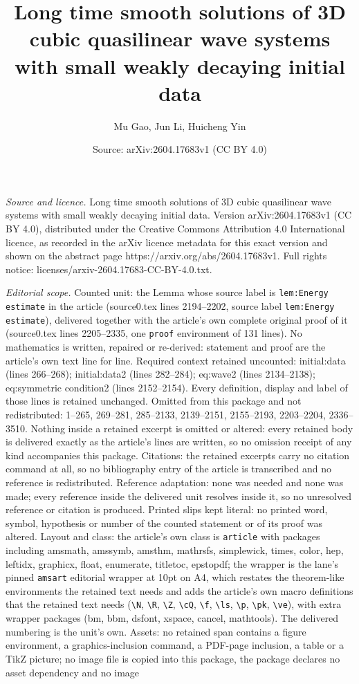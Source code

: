 \documentclass[10pt,a4paper]{amsart}
\title[Long time smooth solutions of 3D cubic quasilinear wave syst]{Long time smooth solutions of 3D cubic quasilinear wave systems with small weakly decaying initial data}
\author{Mu Gao, Jun Li, Huicheng Yin}
\date{Source: arXiv:2604.17683v1 (CC BY 4.0)}
\begin{document}
\maketitle

\noindent\emph{Source and licence.} Long time smooth solutions of 3D cubic quasilinear wave systems with small weakly decaying initial data. Version arXiv:2604.17683v1 (CC BY 4.0), distributed under the Creative Commons Attribution 4.0 International licence, as recorded in the arXiv licence metadata for this exact version and shown on the abstract page https://arxiv.org/abs/2604.17683v1. Full rights notice: licenses/arxiv-2604.17683-CC-BY-4.0.txt.\par\smallskip

\noindent\textit{Editorial scope.} Counted unit: the Lemma whose source label is \texttt{lem:Energy estimate} in the article (source0.tex lines 2194--2202, source label \texttt{lem:Energy estimate}), delivered together with the article's own complete original proof of it (source0.tex lines 2205--2335, one \texttt{proof} environment of 131 lines). No mathematics is written, repaired or re-derived: statement and proof are the article's own text line for line. Required context retained uncounted: initial:data (lines 266--268); initial:data2 (lines 282--284); eq:wave2 (lines 2134--2138); eq:symmetric condition2 (lines 2152--2154). Every definition, display and label of those lines is retained unchanged. Omitted from this package and not redistributed: 1--265, 269--281, 285--2133, 2139--2151, 2155--2193, 2203--2204, 2336--3510. Nothing inside a retained excerpt is omitted or altered: every retained body is delivered exactly as the article's lines are written, so no omission receipt of any kind accompanies this package. Citations: the retained excerpts carry no citation command at all, so no bibliography entry of the article is transcribed and no reference is redistributed. Reference adaptation: none was needed and none was made; every reference inside the delivered unit resolves inside it, so no unresolved reference or citation is produced. Printed slips kept literal: no printed word, symbol, hypothesis or number of the counted statement or of its proof was altered. Layout and class: the article's own class is \texttt{article} with packages including amsmath, amssymb, amsthm, mathrsfs, simplewick, times, color, hep, leftidx, graphicx, float, enumerate, titletoc, epstopdf; the wrapper is the lane's pinned \texttt{amsart} editorial wrapper at 10pt on A4, which restates the theorem-like environments the retained text needs and adds the article's own macro definitions that the retained text needs (\texttt{\textbackslash N}, \texttt{\textbackslash R}, \texttt{\textbackslash Z}, \texttt{\textbackslash cQ}, \texttt{\textbackslash f}, \texttt{\textbackslash ls}, \texttt{\textbackslash p}, \texttt{\textbackslash pk}, \texttt{\textbackslash ve}), with extra wrapper packages (bm, bbm, dsfont, xspace, cancel, mathtools). The delivered numbering is the unit's own. Assets: no retained span contains a figure environment, a graphics-inclusion command, a PDF-page inclusion, a table or a TikZ picture; no image file is copied into this package, the package declares no asset dependency and no image 
\end{document}
